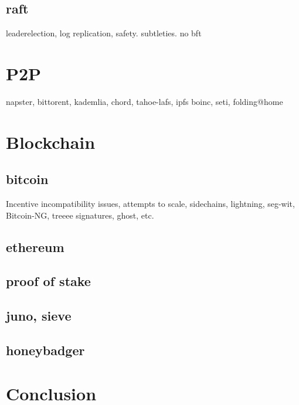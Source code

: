 	\subsection{raft} leaderelection, log replication, safety. subtleties. no bft

\section{P2P}
	napster, bittorent, kademlia, chord, tahoe-lafs, ipfs
	boinc, seti, folding@home

\section{Blockchain}
	\subsection{bitcoin} Incentive incompatibility issues, attempts to scale, sidechains, lightning, seg-wit, Bitcoin-NG,
	treeee signatures, ghost, etc.
	\subsection{ethereum}
	\subsection{proof of stake}
	\subsection{juno, sieve}
	\subsection{honeybadger}


\section{Conclusion}

